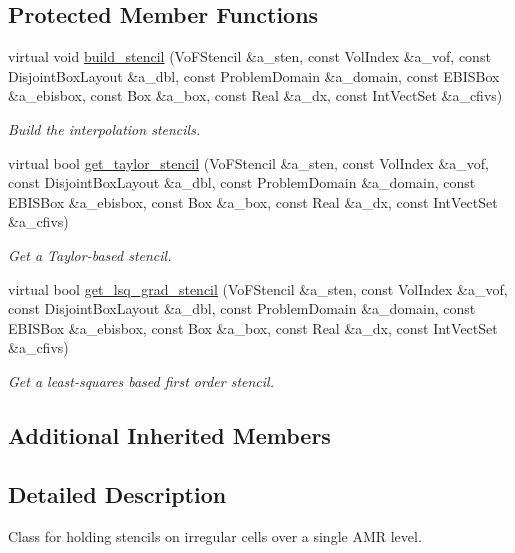 \subsection*{Protected Member Functions}
\begin{DoxyCompactItemize}
\item 
virtual void \hyperlink{classcentroid__interp_aa216076fded0a550013647ee4a05c31c}{build\+\_\+stencil} (Vo\+F\+Stencil \&a\+\_\+sten, const Vol\+Index \&a\+\_\+vof, const Disjoint\+Box\+Layout \&a\+\_\+dbl, const Problem\+Domain \&a\+\_\+domain, const E\+B\+I\+S\+Box \&a\+\_\+ebisbox, const Box \&a\+\_\+box, const Real \&a\+\_\+dx, const Int\+Vect\+Set \&a\+\_\+cfivs)
\begin{DoxyCompactList}\small\item\em Build the interpolation stencils. \end{DoxyCompactList}\item 
virtual bool \hyperlink{classcentroid__interp_a17c58b065b4f83d3fb52d8b9470ddff9}{get\+\_\+taylor\+\_\+stencil} (Vo\+F\+Stencil \&a\+\_\+sten, const Vol\+Index \&a\+\_\+vof, const Disjoint\+Box\+Layout \&a\+\_\+dbl, const Problem\+Domain \&a\+\_\+domain, const E\+B\+I\+S\+Box \&a\+\_\+ebisbox, const Box \&a\+\_\+box, const Real \&a\+\_\+dx, const Int\+Vect\+Set \&a\+\_\+cfivs)
\begin{DoxyCompactList}\small\item\em Get a Taylor-\/based stencil. \end{DoxyCompactList}\item 
virtual bool \hyperlink{classcentroid__interp_a45f99721bfb7eaaec45f4b63c251d424}{get\+\_\+lsq\+\_\+grad\+\_\+stencil} (Vo\+F\+Stencil \&a\+\_\+sten, const Vol\+Index \&a\+\_\+vof, const Disjoint\+Box\+Layout \&a\+\_\+dbl, const Problem\+Domain \&a\+\_\+domain, const E\+B\+I\+S\+Box \&a\+\_\+ebisbox, const Box \&a\+\_\+box, const Real \&a\+\_\+dx, const Int\+Vect\+Set \&a\+\_\+cfivs)
\begin{DoxyCompactList}\small\item\em Get a least-\/squares based first order stencil. \end{DoxyCompactList}\end{DoxyCompactItemize}
\subsection*{Additional Inherited Members}


\subsection{Detailed Description}
Class for holding stencils on irregular cells over a single A\+MR level. 

